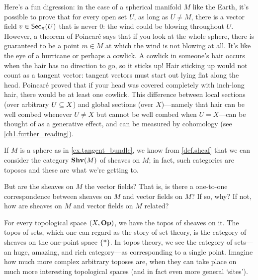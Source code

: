 \documentclass[7Sketches]{subfiles}
\begin{document}
\begin{example}
Here's a fun digression: in the case of a spherical manifold $M$ like the Earth,
it's possible to prove that for every open set $U$, as long as $U\neq M$, there
is a vector field $v\in\Fun{Sec}_\pi(U)$ that is never 0: the wind could be
blowing throughout $U$. However, a theorem of Poincar\'e says that if you look
at the whole sphere, there is guaranteed to be a point $m\in M$ at which the
wind is not blowing at all. It's like the eye of a hurricane or perhaps a
cowlick. A cowlick in someone's hair occurs when the hair has no direction to
go, so it sticks up! Hair sticking up would not count as a tangent vector:
tangent vectors must start out lying flat along the head. Poincar\'{e} proved
that if your head was covered completely with inch-long hair, there would be at
least one cowlick. This difference between local sections (over arbitrary $U\ss
X$) and global sections (over $X$)---namely that hair can be well combed
whenever $U\neq X$ but cannot be well combed when $U=X$---can be thought of as a
generative effect, and can be measured by cohomology (see
\cref{ch1.further_reading}).%
\end{example}%

\begin{exercise}%
\label{exc.whats_the_sheaf}
If $M$ is a sphere as in \cref{ex.tangent_bundle}, we know from \cref{def.sheaf} that we can consider the category $\Shv(M)$ of sheaves on $M$; in fact, such categories are toposes and these are what we're getting to.

But are the sheaves on $M$ the vector fields? That is, is there a one-to-one correspondence between sheaves on $M$ and vector fields on $M$? If so, why? If not, how are sheaves on $M$ and vector fields on $M$ related?
\end{exercise}

\begin{example}%
\label{ex.Sets_as_sheaves}%
For every topological space $(X,\Op)$, we have the topos of sheaves on it. The topos of sets, which one can regard as the story of set theory, is the category of sheaves on the one-point space $\{*\}$. In topos theory, we see the category of sets---an huge, amazing, and rich category---as corresponding to a single point. Imagine how much more complex arbitrary toposes are, when they can take place on much more interesting topological spaces (and in fact even more general `sites'). 
\end{example}
\end{document}
